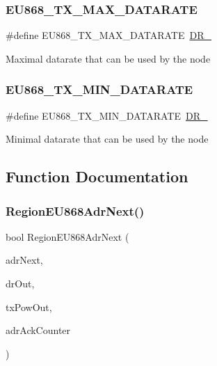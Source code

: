 \subsubsection{\texorpdfstring{E\+U868\+\_\+\+T\+X\+\_\+\+M\+A\+X\+\_\+\+D\+A\+T\+A\+R\+A\+TE}{EU868\_TX\_MAX\_DATARATE}}
{\footnotesize\ttfamily \#define E\+U868\+\_\+\+T\+X\+\_\+\+M\+A\+X\+\_\+\+D\+A\+T\+A\+R\+A\+TE~\hyperlink{group__REGION_ga3a06805baf4f00911a3a5d3dbadebf61}{D\+R\+\_}}

Maximal datarate that can be used by the node \mbox{\label{group__REGIONEU868_ga2df2a8fc7db7e674c3e58de0dd1c90a4}} 
\subsubsection{\texorpdfstring{E\+U868\+\_\+\+T\+X\+\_\+\+M\+I\+N\+\_\+\+D\+A\+T\+A\+R\+A\+TE}{EU868\_TX\_MIN\_DATARATE}}
{\footnotesize\ttfamily \#define E\+U868\+\_\+\+T\+X\+\_\+\+M\+I\+N\+\_\+\+D\+A\+T\+A\+R\+A\+TE~\hyperlink{group__REGION_ga6c4ef966b4f3d5eb7597b087f2b97095}{D\+R\+\_}}

Minimal datarate that can be used by the node 

\subsection{Function Documentation}
\mbox{\label{group__REGIONEU868_gaa93c92348ce901ace20e766be0be1941}} 
\subsubsection{\texorpdfstring{Region\+E\+U868\+Adr\+Next()}{RegionEU868AdrNext()}}
{\footnotesize\ttfamily bool Region\+E\+U868\+Adr\+Next (\begin{DoxyParamCaption}\item[{\hyperlink{group__REGION_ga567c2742622326b350b4e91bbf61b4ce}{Adr\+Next\+Params\+\_\+t} $\ast$}]{adr\+Next,  }\item[{int8\+\_\+t $\ast$}]{dr\+Out,  }\item[{int8\+\_\+t $\ast$}]{tx\+Pow\+Out,  }\item[{uint32\+\_\+t $\ast$}]{adr\+Ack\+Counter }\end{DoxyParamCaption})}



